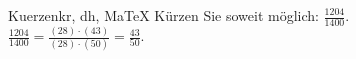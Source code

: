 \begin{MAufgabe}{Kuerzen}{kr, dh, MaTeX}
K\"urzen Sie soweit m\"oglich: $\frac{1204}{1400}$.\\ 
\ifLsg\MLoesung
\quad $\frac{1204}{1400}=\frac{(28)\cdot(43)}{(28)\cdot(50)}=\frac{43}{50}$.\else\relax\fi
 \end{MAufgabe}
